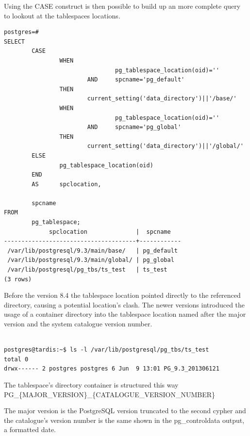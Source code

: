 Using the CASE construct is then possible to build up an more complete query to lookout at the 
tablespaces locations.\newpage

\begin{lstlisting}[style=pgsql]
 postgres=# 
SELECT 
        CASE
                WHEN 
                                pg_tablespace_location(oid)=''
                        AND     spcname='pg_default'
                THEN
                        current_setting('data_directory')||'/base/'
                WHEN 
                                pg_tablespace_location(oid)=''
                        AND     spcname='pg_global'
                THEN
                        current_setting('data_directory')||'/global/'
        ELSE
                pg_tablespace_location(oid)
        END
        AS      spclocation,
                
        spcname 
FROM 
        pg_tablespace;
             spclocation              |  spcname   
--------------------------------------+------------
 /var/lib/postgresql/9.3/main/base/   | pg_default
 /var/lib/postgresql/9.3/main/global/ | pg_global
 /var/lib/postgresql/pg_tbs/ts_test   | ts_test
(3 rows)

\end{lstlisting}

Before the version 8.4 the tablespace location pointed directly to the referenced directory, 
causing 
a potential location's clash. The newer versions introduced the usage of a container directory into 
the tablespace location named after the major version and the system catalogue version number. 
\newline

\begin{verbatim}

postgres@tardis:~$ ls -l /var/lib/postgresql/pg_tbs/ts_test
total 0
drwx------ 2 postgres postgres 6 Jun  9 13:01 PG_9.3_201306121

\end{verbatim}

The tablespace's directory container is structured this way\newline
PG\_\{MAJOR\_VERSION\}\_\{CATALOGUE\_VERSION\_NUMBER\}\newline

The major version is the PostgreSQL version truncated to the second cypher and the catalogue's 
version number is the same shown in the pg\_controldata output, a formatted date.

